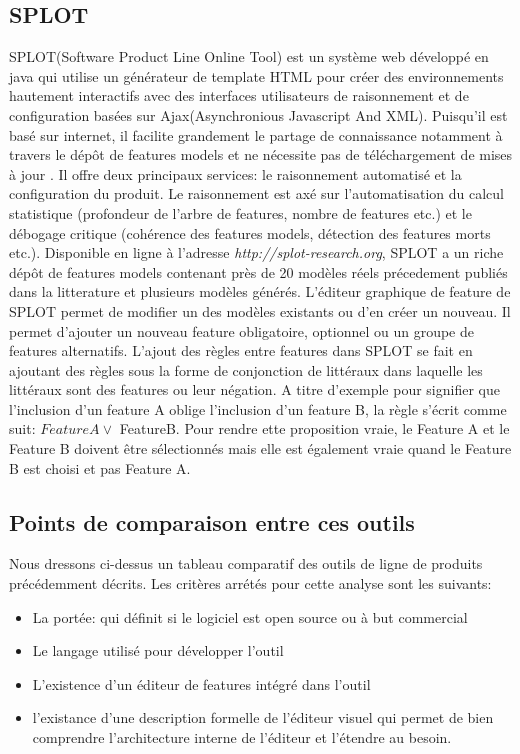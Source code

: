 \subsection{SPLOT}
SPLOT(Software Product Line Online Tool) \cite{Marcilio2009} est un système web développé en java qui utilise un générateur de template HTML pour créer des environnements hautement interactifs avec des interfaces utilisateurs de raisonnement et de configuration basées sur Ajax(Asynchronious Javascript And XML). Puisqu'il est basé sur internet, il facilite grandement le partage de connaissance notamment à travers le dépôt de features models et ne nécessite pas de téléchargement de mises à jour . Il offre deux principaux services: le raisonnement automatisé et la configuration du produit. Le raisonnement est axé sur l’automatisation du calcul statistique (profondeur de l'arbre de features, nombre de features etc.) et le débogage critique (cohérence des features models, détection des features morts etc.). Disponible en ligne à l'adresse \textsl{http://splot-research.org}, SPLOT a un riche dépôt de features models contenant près de 20 modèles réels précedement publiés dans la litterature et plusieurs modèles générés. L'éditeur graphique de feature de SPLOT permet de modifier un des modèles existants ou d'en créer un nouveau. Il permet d'ajouter un nouveau feature obligatoire, optionnel ou un groupe de features alternatifs. L'ajout des règles entre features dans SPLOT se fait en ajoutant des règles sous la forme de conjonction de littéraux dans laquelle les littéraux sont des features ou leur négation. A titre d'exemple pour signifier que l'inclusion d'un feature A oblige l'inclusion d'un feature B, la règle s'écrit comme suit: 
\lnot$FeatureA  \lor$ FeatureB. Pour rendre ette proposition vraie, le Feature A et le Feature B doivent être sélectionnés mais elle est également vraie quand le Feature B est choisi et pas Feature A. 

\subsection{Points de comparaison entre ces outils}
Nous dressons ci-dessus un tableau comparatif des outils de ligne de produits précédemment décrits. Les critères arrétés pour cette analyse sont les suivants:
 
 \begin{itemize}
	 \item  La portée: qui définit si le logiciel est open source ou à but commercial
	 \item  Le langage utilisé pour développer l'outil
	 \item  L’existence d'un éditeur de features intégré dans l'outil
	 \item  l'existance d'une description formelle de l'éditeur visuel qui permet de bien comprendre l'architecture interne de l'éditeur et l'étendre au besoin.
 \end{itemize}

